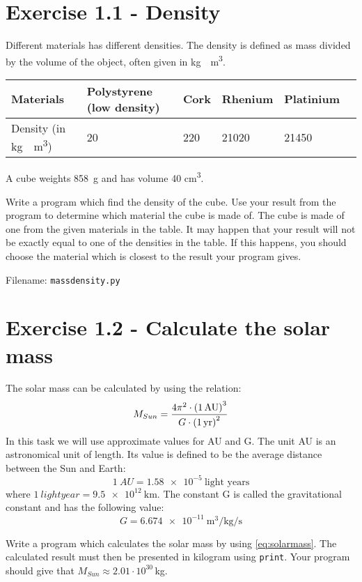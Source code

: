 \documentclass[10pt,a4paper]{article}
\begin{document}
	\section*{Exercise 1.1 - Density}
	Different materials has different densities. The density is defined as mass divided by the volume of the object, often given in \si{\kg.\per\cubic\meter}.
	\begin{center}
	\begin{tabular}{l | l  l  l  l l}
			Materials & Polystyrene (low density) & Cork & Rhenium & Platinium \\ \hline 
			Density (in \si{\kg.\per\cubic\meter}) &20 & 220  & 21020 & 21450
	\end{tabular} 
	\end{center}
	A cube weights \SI{858}{g} and has volume 40 \si{\cubic\centi\meter}. 
	
	Write a program which find the density of the cube. Use your result from the program to determine which material the cube is made of. The cube is made of one from the given materials in the table. It may happen that your result will not be exactly  equal to one of the densities in the table. If this happens, you should choose the material which is closest to the result your program gives. 
	
	Filename: \texttt{massdensity.py}


\section*{Exercise 1.2 - Calculate the solar mass}
	The solar mass can be calculated by using the relation:
	\begin{equation}\label{eq:solarmass}
	M_{Sun} = \frac{4\pi^2 \cdot\qty(\SI{1}{AU})^3}{G \cdot \qty(\SI{1}{yr})^2}
	\end{equation}
	In this task we will use approximate values for AU and G. 
	The unit AU is an astronomical unit of length. Its value is defined to be the average distance between the Sun and Earth:
	\[
	\SI{1}{AU} = \SI{1.58e-5 }{\text{light years}}
	\]
	where
	$
		\SI{1}{light year} = \SI{9.5e12}{\km} 
	$.
	The constant G is called the gravitational constant and has the following value:
	\[
	G = \SI{6.674e-11}{\cubic\meter\per\kg\per\second} 
	\]
	
	Write a program which calculates the solar mass by using \vref{eq:solarmass}. The calculated result must then be presented in kilogram using \texttt{print}. Your program should give that $M_{Sun} \approx 2.01 \cdot 10^{30}\,$kg.
	
\end{document}
